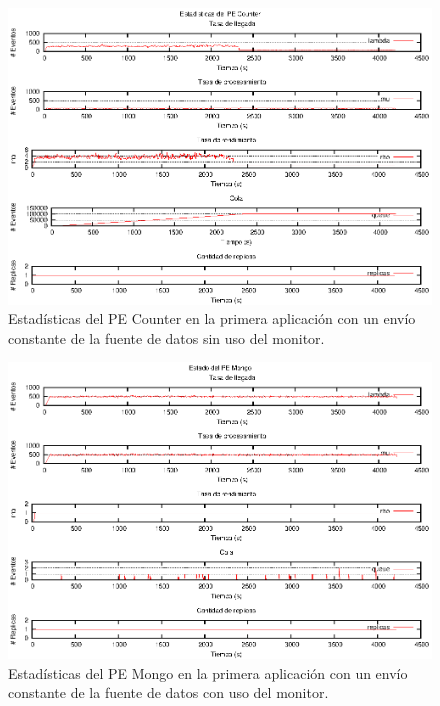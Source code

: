 \begin{figure}[p]
\centering
    \includegraphics[scale=1.1]{images/exp/app1/uniform/sm/statusCounterPE.eps}
    \caption{Estadísticas del PE Counter en la primera aplicación con un envío constante de la fuente de datos sin uso del monitor.}
    \label{fig:app1-uniform-statusCounterPE-sm}
\end{figure}

\begin{figure}[p]
\centering
    \includegraphics[scale=1.1]{images/exp/app1/uniform/cm/statusMongoPE.eps}
    \caption{Estadísticas del PE Mongo en la primera aplicación con un envío constante de la fuente de datos con uso del monitor.}
    \label{fig:app1-uniform-statusMongoPE-cm}
\end{figure}

